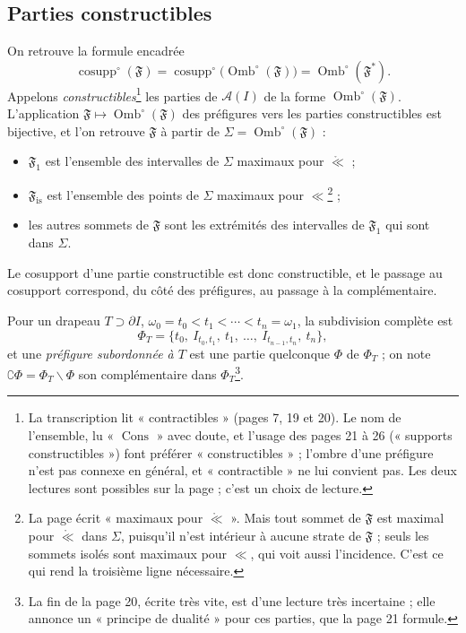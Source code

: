 \documentclass[11pt,a4paper]{article}
\begin{document}
\subsection*{Parties constructibles}

On retrouve la formule encadrée
\[
\operatorname{cosupp}^{\circ}(\mathfrak{F}) =
\operatorname{cosupp}^{\circ}\bigl(\operatorname{Omb}^{\circ}(\mathfrak{F})\bigr) =
\operatorname{Omb}^{\circ}(\mathfrak{F}^{*}) .
\]
Appelons \emph{constructibles}\footnote{La transcription lit « contractibles »
(pages 7, 19 et 20). Le nom de l'ensemble, lu « $\operatorname{Cons}$ » avec
doute, et l'usage des pages 21 à 26 (« supports constructibles ») font préférer
« constructibles » ; l'ombre d'une préfigure n'est pas connexe en général, et
« contractible » ne lui convient pas. Les deux lectures sont possibles sur la
page ; c'est un choix de lecture.} les parties de $\mathcal{A}(I)$ de la forme
$\operatorname{Omb}^{\circ}(\mathfrak{F})$. L'application $\mathfrak{F} \mapsto
\operatorname{Omb}^{\circ}(\mathfrak{F})$ des préfigures vers les parties
constructibles est bijective, et l'on retrouve $\mathfrak{F}$ à partir de
$\Sigma = \operatorname{Omb}^{\circ}(\mathfrak{F})$ :
\begin{itemize}
\item $\mathfrak{F}_{1}$ est l'ensemble des intervalles de $\Sigma$ maximaux
pour $\mathrel{\mathring{\ll}}$ ;
\item $\mathfrak{F}_{\mathrm{is}}$ est l'ensemble des points de $\Sigma$
maximaux pour $\ll$\footnote{La page écrit « maximaux pour
$\mathrel{\mathring{\ll}}$ ». Mais tout sommet de $\mathfrak{F}$ est maximal pour
$\mathrel{\mathring{\ll}}$ dans $\Sigma$, puisqu'il n'est intérieur à aucune
strate de $\mathfrak{F}$ ; seuls les sommets isolés sont maximaux pour $\ll$, qui
voit aussi l'incidence. C'est ce qui rend la troisième ligne nécessaire.} ;
\item les autres sommets de $\mathfrak{F}$ sont les extrémités des intervalles de
$\mathfrak{F}_{1}$ qui sont dans $\Sigma$.
\end{itemize}
Le cosupport d'une partie constructible est donc constructible, et le passage au
cosupport correspond, du côté des préfigures, au passage à la complémentaire.

Pour un drapeau $T \supset \partial I$, $\omega_{0} = t_{0} < t_{1} < \cdots <
t_{n} = \omega_{1}$, la subdivision complète est
\[
\Phi_{T} = \{ t_{0},\ I_{t_{0},t_{1}},\ t_{1},\ \ldots,\ I_{t_{n-1},t_{n}},\
t_{n} \},
\]
et une \emph{préfigure subordonnée à $T$} est une partie quelconque $\Phi$ de
$\Phi_{T}$ ; on note $\complement\Phi = \Phi_{T} \smallsetminus \Phi$ son
complémentaire dans $\Phi_{T}$\footnote{La fin de la page 20, écrite très vite,
est d'une lecture très incertaine ; elle annonce un « principe de dualité » pour
ces parties, que la page 21 formule.}.
\end{document}
